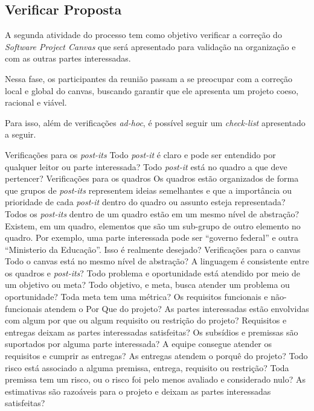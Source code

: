 \documentclass[a4]{report}
\begin{document}
\subsection{Verificar Proposta}

A segunda atividade do processo tem como objetivo verificar a correção do \textit{Software Project Canvas} que será apresentado para validação na organização e com as outras partes interessadas.

Nessa fase, os participantes da reunião passam a se preocupar com a correção local e global do canvas, buscando garantir que ele apresenta um projeto coeso, racional e viável.

Para isso, além de verificações \textit{ad-hoc}, é possível seguir um \textit{check-list} apresentado a seguir.
\begin{outline}
    \1 Verificações para os \textit{post-its}
    \2 Todo \textit{post-it} é claro e pode ser entendido por qualquer leitor ou parte interessada?
    \2 Todo \textit{post-it} está no quadro a que deve pertencer?
    \1 Verificações para os quadros
    \2 Os quadros estão organizados de forma que grupos de \textit{post-its} representem ideias semelhantes e que a importância ou prioridade de cada \textit{post-it} dentro do quadro ou assunto esteja representada?
    \2 Todos os \textit{post-its} dentro de um quadro estão em um mesmo nível de abstração?
    \2 Existem, em um quadro, elementos que são um sub-grupo de outro elemento no quadro. Por exemplo, uma parte interessada pode ser ``governo federal'' e outra ``Ministerio da Educação''. Isso é realmente desejado?
    \1 Verificações para o canvas
    \2 Todo o canvas está no mesmo nível de abstração?
    \2 A linguagem é consistente entre os quadros e \textit{post-its}?
    \2 Todo problema e oportunidade está atendido por meio de um objetivo ou meta?
    \2 Todo objetivo, e meta, busca atender um problema ou oportunidade?
    \2 Toda meta tem uma métrica?
    \2 Os requisitos funcionais e não-funcionais atendem o Por Que do projeto?
    \2 As partes interessadas estão envolvidas com algum por que ou algum requisito ou restrição do projeto?
    \2 Requisitos e entregas deixam as partes interessadas satisfeitas?
    \2 Os subsídios e premissas são suportados por alguma parte interessada?
    \2 A equipe consegue atender os requisitos e cumprir as entregas?
    \2 As entregas atendem o porquê do projeto?
    \2 Todo risco está associado a alguma premissa, entrega, requisito ou restrição?
    \2 Toda premissa tem um risco, ou o risco foi pelo menos avaliado e considerado nulo?
    \2 As estimativas são razoáveis para o projeto e deixam as partes interessadas satisfeitas?
\end{outline}
\end{document}
